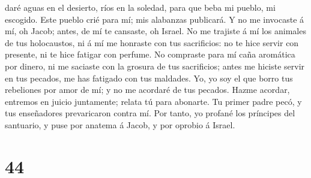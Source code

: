 daré aguas en el desierto, ríos en la soledad, para que beba mi pueblo,
mi escogido.  Este pueblo crié para mí; mis alabanzas
publicará.  Y no me invocaste á mí, oh Jacob; antes, de
mí te cansaste, oh Israel.  No me trajiste á mí los
animales de tus holocaustos, ni á mí me honraste con tus sacrificios: no
te hice servir con presente, ni te hice fatigar con perfume.
 No compraste para mí caña aromática por dinero, ni me
saciaste con la grosura de tus sacrificios; antes me hiciste servir en
tus pecados, me has fatigado con tus maldades.  Yo, yo
soy el que borro tus rebeliones por amor de mí; y no me acordaré de tus
pecados.  Hazme acordar, entremos en juicio juntamente;
relata tú para abonarte.  Tu primer padre pecó, y tus
enseñadores prevaricaron contra mí.  Por tanto, yo
profané los príncipes del santuario, y puse por anatema á Jacob, y por
oprobio á Israel.

\hypertarget{section-43}{%
\section{44}\label{section-43}}


